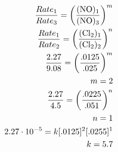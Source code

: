 \documentclass[12pt]{article}
\begin{document}
\begin{itemize}
    \begin{equation}
      \begin{split}
        \frac{Rate_1}{Rate_3}=\left( \frac{(\ce{NO})_1}{(\ce{NO})_3} \right)^m\\
        \frac{Rate_1}{Rate_2}=\left( \frac{(\ce{Cl2})_1}{(\ce{Cl2})_2} \right)^n\\
        \frac{2.27}{9.08}=\left( \frac{.0125}{.025} \right)^m\\
        m=2\\
        \frac{2.27}{4.5}=\left( \frac{.0225}{.051} \right)^n\\
        n=1\\
        2.27\cdot10^{-5}=k[.0125]^2[.0255]^1\\
        k=5.7
      \end{split}
      \label{2}
    \end{equation}

\end{itemize}
\end{document}
